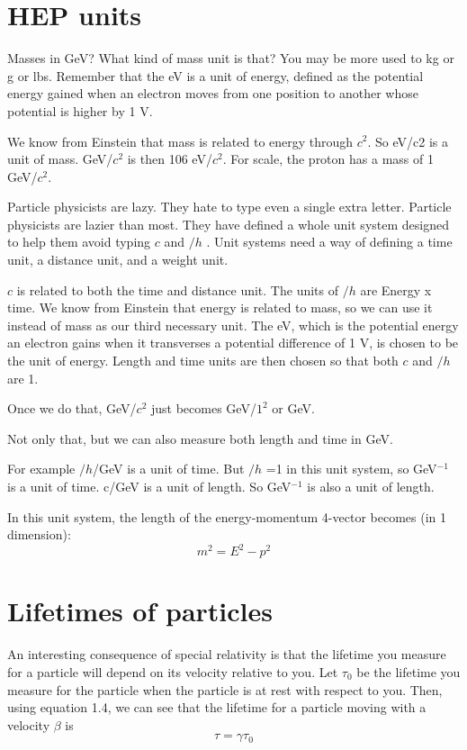 \section{HEP units}

Masses in GeV?  What kind of mass unit is that? You may be more used to kg or g or lbs.  Remember that the eV is a unit of energy, defined as the potential energy gained when an electron moves from one position to another whose potential is higher by 1 V.

We know from Einstein that mass is related to energy through $c^2$.  So eV/c2 is a unit of mass.  GeV/$c^2$ is then 106 eV/$c^2$.  For scale, the proton has a mass of 1 GeV/$c^2$.

Particle physicists are lazy.  They hate to type even a single extra letter.  Particle physicists are lazier than most.  They have defined a whole unit system designed to help them avoid typing $c$ and $\slash h$ .  Unit systems need a way of defining a time unit, a distance unit, and a weight unit.  

$c$ is related to both the time and distance unit.  The units of  $\slash h$ are Energy x time. We know from Einstein that energy is related to mass, so we can use it instead of mass as our third necessary unit.  The eV, which is the potential energy an electron gains when it transverses a potential difference of 1 V, is chosen to be the unit of energy. Length and time units are then chosen so that both $c$ and $\slash h$  are 1.  

Once we do that, GeV/$c^2$ just becomes GeV/$1^2$ or GeV.

Not only that, but we can also measure both length and time in GeV.

For example  $\slash h$/GeV is a unit of time.  But $\slash h$ =1 in this unit system, so GeV$^{-1}$ is a unit of time.
 c/GeV is a unit of length.  So GeV$^{-1}$ is also a unit of length.

In this unit system, the length of the energy-momentum 4-vector becomes (in 1 dimension):
\begin{equation}
	  m^2 = E^2 - p^2
\end{equation}  	 


\section{Lifetimes of particles}

An interesting consequence of special relativity is that the lifetime you measure for a particle will depend on its velocity relative to you.  Let $\tau _0$  be the lifetime you measure for the particle when the particle is at rest with respect to you.  Then, using equation 1.4, we can see that the lifetime for a particle moving with a velocity $\beta$  is
\begin{equation}
	 \tau  = \gamma \tau _0
\end{equation}  	 

